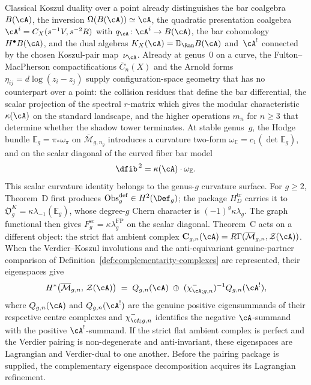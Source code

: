 Classical Koszul duality over a point already distinguishes the bar
coalgebra $B(\cA)$, the inversion $\Omega(B(\cA)) \simeq \cA$, the
quadratic presentation coalgebra
$\cA^i=C_X(s^{-1}V,s^{-2}R)$ with
$q_\cA\colon\cA^i\to B(\cA)$, the bar cohomology
$H^\bullet B(\cA)$, and the dual algebras
$K_X(\cA)=\mathbb D_{\Ran}B(\cA)$ and~$\cA^!$ connected by the
chosen Koszul-pair map~$\nu_\cA$.
Already at genus~$0$ on a curve, the Fulton--MacPherson
compactifications $\overline{C}_n(X)$ and the Arnold forms
$\eta_{ij} = d\log(z_i - z_j)$ supply configuration-space geometry
that has no counterpart over a point: the collision residues that
define the bar differential, the scalar projection of the spectral
$r$-matrix which gives the modular characteristic
$\kappa(\cA)$ on the standard landscape, and the higher operations
$m_n$ for $n \geq 3$ that determine whether the shadow tower
terminates. At stable genus~$g$, the Hodge bundle
$\mathbb{E}_g=\pi_*\omega_\pi$ on $\overline{\mathcal{M}}_{g,n_g}$
introduces a curvature two-form
$\omega_{\mathbb{E}}=c_1(\det\mathbb{E}_g)$, and on the scalar
diagonal of the curved fiber bar model
\[
  \dfib^{\,2}
  =
  \kappa(\cA)\cdot\omega_{\mathbb{E}}.
\]
This scalar curvature identity belongs to the genus-$g$ curvature
surface.  For $g\geq2$, Theorem~D first produces
$\operatorname{Obs}^{\mathrm{def}}_g\in H^2(\Def_g)$; the package
$H_D^{\mathrm{tr}}$ carries it to
$\mathfrak O_g^K=\kappa\lambda_{-1}(\mathbb E_g)$, whose degree-$g$
Chern character is $(-1)^g\kappa\lambda_g$.  The graph functional
then gives $F_g^{\mathrm{sc}}=\kappa\lambda_g^{\mathrm{FP}}$ on the
scalar diagonal. Theorem~C acts on a different object: the
strict flat ambient complex
$\mathbf{C}_{g,n}(\cA)=
R\Gamma(\overline{\mathcal{M}}_{g,n},\mathcal{Z}(\cA))$.
When the Verdier--Koszul involutions and the anti-equivariant
genuine-partner comparison of
Definition~\ref{def:complementarity-complexes} are represented, their
eigenspaces give
\begin{equation}\label{eq:complementarity-chapter-opening}
 H^*\bigl(\overline{\mathcal{M}}_{g,n},\,\mathcal{Z}(\cA)\bigr)
 \;=\;
 Q_{g,n}(\cA) \;\oplus\;
 (\chi^-_{\cA;g,n})^{-1}Q_{g,n}(\cA^!),
\end{equation}
where \(Q_{g,n}(\cA)\) and \(Q_{g,n}(\cA^!)\) are the genuine
positive eigensummands of their respective centre complexes and
\(\chi^-_{\cA;g,n}\) identifies the negative \(\cA\)-summand with
the positive \(\cA^!\)-summand.
If the strict flat ambient complex is perfect and the Verdier pairing
is non-degenerate and anti-invariant, these eigenspaces are
Lagrangian and Verdier-dual to one another.  Before the pairing package
is supplied, the complementary eigenspace decomposition acquires its
Lagrangian refinement.


